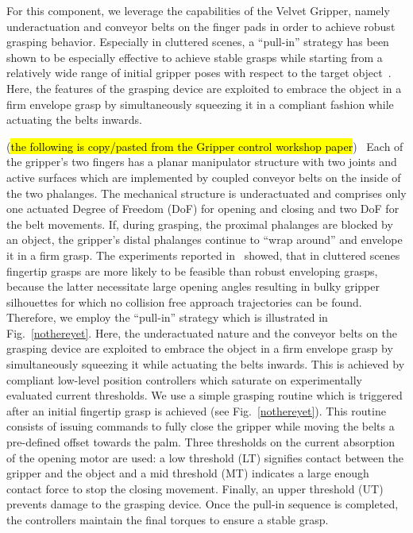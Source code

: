 %
For this component, we leverage the capabilities of the Velvet Gripper, namely underactuation and
conveyor belts on the finger pads in order to achieve robust grasping behavior. Especially in
cluttered scenes, a ``pull-in'' strategy has been shown to be especially effective to achieve stable
grasps while starting from a relatively wide range of initial gripper poses with respect to the
target object~\cite{Krug14a}. Here, the features of the grasping device are exploited to embrace the
object in a firm envelope grasp by simultaneously squeezing it in a compliant fashion while
actuating the belts inwards.

(\hl{the following is copy/pasted from the Gripper control workshop paper})~\cite{Krug14c} Each of
the gripper’s two fingers has a planar manipulator structure with two joints and active surfaces
which are implemented by coupled conveyor belts on the inside of the two phalanges. The mechanical
structure is underactuated and comprises only one actuated Degree of Freedom (DoF) for opening and
closing and two DoF for the belt movements.  If, during grasping, the proximal phalanges are blocked
by an object, the gripper’s distal phalanges continue to “wrap around” and envelope it in a firm
grasp.  The experiments reported in~\cite{Krug14a} showed, that in cluttered scenes fingertip
grasps are more likely to be feasible than robust enveloping grasps, because the latter necessitate
large opening angles resulting in bulky gripper silhouettes for which no collision free approach
trajectories can be found. Therefore, we employ the “pull-in” strategy which is illustrated in
Fig.~\ref{nothereyet}. Here, the underactuated nature and the conveyor belts on the grasping device
are exploited to embrace the object in a firm envelope grasp by simultaneously squeezing it while
actuating the belts inwards. This is achieved by compliant low-level position controllers which
saturate on experimentally evaluated current thresholds. We use a simple grasping routine which is
triggered after an initial fingertip grasp is achieved (see Fig.~\ref{nothereyet}). This routine
consists of issuing commands to fully close the gripper while moving the belts a pre-defined offset
towards the palm. Three thresholds on the current absorption of the opening motor are used: a low
threshold (LT) signifies contact between the gripper and the object and a mid threshold (MT)
indicates a large enough contact force to stop the closing movement.  Finally, an upper threshold
(UT) prevents damage to the grasping device. Once the pull-in sequence is completed, the controllers
maintain the final torques to ensure a stable grasp.

